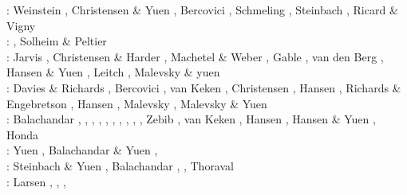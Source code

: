 \begin{scriptsize}
\nineteeneightynine: Weinstein \etal \cite{weoy89}, Christensen \& Yuen \cite{chyu89},
                     Bercovici \etal \cite{besg89}, Schmeling \cite{schm89},
                     Steinbach \etal \cite{sthe89}, Ricard \& Vigny \cite{rivi89}\\
\nineteenninety: \cite{trab90}\cite{gurn90}\cite{ketu90}, Solheim \& Peltier \cite{sope90}\\
\nineteenninetyone: Jarvis \cite{jarv91}, Christensen \& Harder \cite{chha91},
                    Machetel \& Weber \cite{mawe91}, Gable \etal \cite{gaot91},
                    van den Berg \etal \cite{vayv91}, Hansen \& Yuen \cite{hayk91},
                    Leitch \etal \cite{leys91} , Malevsky \& yuen \cite{mayu91}\\
\nineteenninetytwo: Davies \& Richards \cite{dari92}, Bercovici \etal \cite{besg92},
                    van Keken \etal{} \cite{vayv92},
                    Christensen \cite{chri92}, Hansen \etal \cite{haym92}, 
                    Richards \& Engebretson \cite{rien92}, Hansen \etal \cite{hayk92},
                    Malevsky \etal \cite{mayw92}, Malevsky \& Yuen \cite{mayu92} \\
\nineteenninetythree: Balachandar \etal \cite{bayr93}, \cite{zhch93},
                      \cite{jarv93}, \cite{tack93},
                      \cite{bucc93}, \cite{carm93},
                      \cite{vavy93}, \cite{tasg93},
                      \cite{zhgu93}, \cite{mamc93},
                      Zebib \cite{zebi93}, van Keken \etal \cite{vayv93}, 
                      Hansen \etal \cite{hayk93}, Hansen \& Yuen \cite{hayu93},
                      Honda \etal \cite{hoyb93,hoby93}\\
\nineteenninetyfour: Yuen \etal \cite{yurb94}, Balachandar \& Yuen \cite{bayu94}, \cite{haeb94}
                     \cite{chho94}\cite{tasg94}\cite{itki94}\cite{leka94}\cite{scha94}\\
\nineteenninetyfive: Steinbach \& Yuen \cite{styu95}, Balachandar \etal \cite{bayr95,bayr95b}, 
                     \cite{zhgu95}
                     \cite{vayv95}\cite{buba95}\cite{rasz95}\cite{berc95}\cite{puhj95}\cite{pujh95}
      \cite{solo95}\cite{vayu95}\cite{matb95}, Thoraval \etal \cite{thmc95}\\
\nineteenninetysix: Larsen \etal \cite{laym96}, \cite{zhyu96},
                    \cite{hond96}\cite{rytr96a}
                    \cite{rytr96b}\cite{tack96}
                    \cite{trbo96}, \cite{birg96}
                    \cite{burb96}\cite{kafo96}
                    \cite{guez96}\cite{vayu96}

\end{scriptsize}
